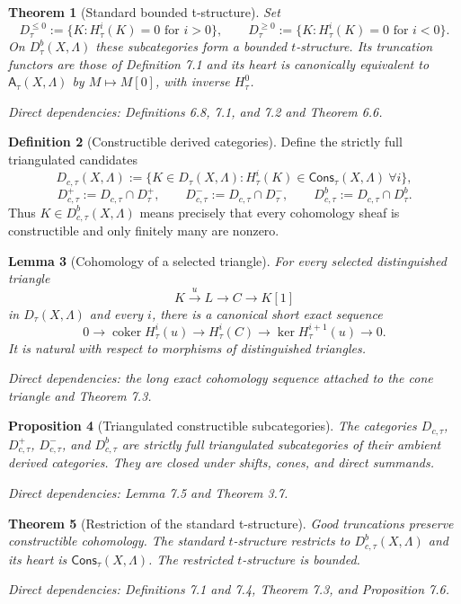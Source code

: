 \documentclass[10pt]{article}
\newtheorem{theorem}{Theorem}[section]
\newtheorem{proposition}[theorem]{Proposition}
\newtheorem{lemma}[theorem]{Lemma}
\theoremstyle{definition}
\newtheorem{definition}[theorem]{Definition}
\newcommand{\Lam}{\Lambda}
\newcommand{\Cons}{\mathsf{Cons}}
\newcommand{\DbcAt}[1]{D^b_{c,#1}}
\newcommand{\dep}[1]{\par\smallskip\noindent\textit{Direct dependencies: #1}}
\begin{document}
\begin{theorem}[Standard bounded t-structure]
Set
\[
D_\tau^{\le0}:=\{K:H^i_\tau(K)=0\text{ for }i>0\},\qquad
D_\tau^{\ge0}:=\{K:H^i_\tau(K)=0\text{ for }i<0\}.
\]
On $D_\tau^b(X,\Lam)$ these subcategories form a bounded $t$-structure.
Its truncation functors are those of Definition 7.1 and its heart is
canonically equivalent to $\mathsf A_\tau(X,\Lam)$ by $M\mapsto M[0]$, with
inverse $H^0_\tau$.
\dep{Definitions 6.8, 7.1, and 7.2 and Theorem 6.6.}
\end{theorem}

\begin{definition}[Constructible derived categories]
Define the strictly full triangulated candidates
\[
D_{c,\tau}(X,\Lam)
:=\{K\in D_\tau(X,\Lam):H^i_\tau(K)\in\Cons_\tau(X,\Lam)\ \forall i\},
\]
\[
D^+_{c,\tau}:=D_{c,\tau}\cap D^+_\tau,
\qquad
 D^-_{c,\tau}:=D_{c,\tau}\cap D^-_\tau,
\qquad
\DbcAt{\tau}:=D_{c,\tau}\cap D^b_\tau.
\]
Thus $K\in\DbcAt{\tau}(X,\Lam)$ means precisely that every cohomology sheaf is
constructible and only finitely many are nonzero.
\end{definition}

\begin{lemma}[Cohomology of a selected triangle]
For every selected distinguished triangle
\[
 K\xrightarrow{u}L\longrightarrow C\longrightarrow K[1]
\]
in $D_\tau(X,\Lam)$ and every $i$, there is a canonical short exact sequence
\[
0\longrightarrow\operatorname{coker}H^i_\tau(u)
\longrightarrow H^i_\tau(C)
\longrightarrow\ker H^{i+1}_\tau(u)\longrightarrow0.
\]
It is natural with respect to morphisms of distinguished triangles.
\dep{the long exact cohomology sequence attached to the cone triangle and
Theorem 7.3.}
\end{lemma}

\begin{proposition}[Triangulated constructible subcategories]
The categories $D_{c,\tau}$, $D^+_{c,\tau}$, $D^-_{c,\tau}$, and
$\DbcAt{\tau}$ are strictly full triangulated subcategories of their ambient
derived categories.  They are
closed under shifts, cones, and direct summands.
\dep{Lemma 7.5 and Theorem 3.7.}
\end{proposition}

\begin{theorem}[Restriction of the standard t-structure]
Good truncations preserve constructible cohomology.  The standard
$t$-structure restricts to $\DbcAt{\tau}(X,\Lam)$ and its heart is
$\Cons_\tau(X,\Lam)$.  The restricted $t$-structure is bounded.
\dep{Definitions 7.1 and 7.4, Theorem 7.3, and Proposition 7.6.}
\end{theorem}
\end{document}

